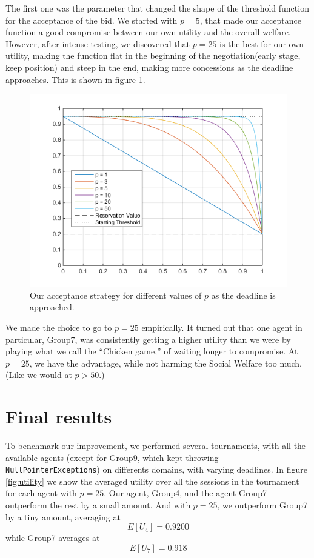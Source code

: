\documentclass[a4,11pt]{scrartcl}
\begin{document}
The first one was the parameter that changed the shape of the threshold function for the acceptance of the bid. We started with $p=5$, that made our acceptance function a good compromise between our own utility and the overall welfare. However, after intense testing, we discovered that $p=25$ is the best for our own utility, making the function flat in the beginning of the negotiation(early stage, keep position) and steep in the end, making more concessions as the deadline approaches. This is shown in figure \ref{fig:chicken}.
\label{sec:improvements}
\begin{figure}[ht]
    \centering
    \includegraphics[width=\textwidth]{chicken.png}
    \caption{Our acceptance strategy for different values of $p$ as the deadline is approached.}
    \label{fig:chicken}
\end{figure}

We made the choice to go to $p=25$ empirically. It turned out that one agent in particular, Group7, was consistently getting a higher utility than we were by playing what we call the ``Chicken game,'' of waiting longer to compromise. At $p=25$, we have the advantage, while not harming the Social Welfare too much. (Like we would at $p>50$.)


\section{Final results}

To benchmark our improvement, we performed several tournaments, with all 
the available agents (except for Group9, which kept throwing 
\verb|NullPointerExceptions|) on differents domains, 
with 
varying deadlines. In figure \ref{fig:utility} we show the averaged utility over all the sessions in the tournament for each agent with $p=25$. Our agent, Group4, and the agent Group7 outperform the rest by a small amount. And with $p=25$, we outperform Group7 by a tiny amount, averaging at $$E[U_{4}]=0.9200$$ while Group7 averages at $$E[U_{7}]=0.918$$
\end{document}
